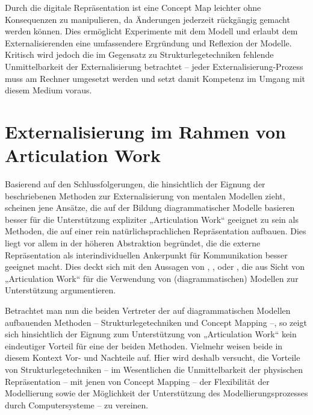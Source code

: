 Durch die digitale Repräsentation ist eine Concept Map leichter ohne Konsequenzen zu manipulieren, da Änderungen jederzeit rückgängig gemacht werden können. Dies ermöglicht Experimente mit dem Modell und erlaubt dem Externalisierenden eine umfassendere Ergründung und Reflexion der Modelle. Kritisch wird jedoch die im Gegensatz zu Strukturlegetechniken fehlende Unmittelbarkeit der Externalisierung betrachtet – jeder Externalisierung-Prozess muss am Rechner umgesetzt werden und setzt damit Kompetenz im Umgang mit diesem Medium voraus. \citet[][S. 30f]{Ifenthaler06}



\section{Externalisierung im Rahmen von Articulation Work} %
\label{sec:externalisierung_im_rahmen_von_articulation_work}

Basierend auf den Schlussfolgerungen, die \citet{Ifenthaler06} hinsichtlich der Eignung der beschriebenen Methoden zur Externalisierung von mentalen Modellen zieht, scheinen jene Ansätze, die auf der Bildung diagrammatischer Modelle basieren besser für die Unterstützung expliziter „Articulation Work“ geeignet zu sein als Methoden, die auf einer rein natürlichsprachlichen Repräsentation aufbauen. Dies liegt vor allem in der höheren Abstraktion begründet, die die externe Repräsentation als interindividuellen Ankerpunkt für Kommunikation besser geeignet macht. Dies deckt sich mit den Aussagen von  \citet{Sarini02}, \citet{Herrmann02}, \citet{Raposo04} oder \citet{Jorgensen04}, die aus Sicht von „Articulation Work“ für die Verwendung von (diagrammatischen) Modellen zur Unterstützung argumentieren.

Betrachtet man nun die beiden Vertreter der auf diagrammatischen Modellen aufbauenden Methoden -- Strukturlegetechniken und Concept Mapping --, so zeigt sich hinsichtlich der Eignung zum Unterstützung von „Articulation Work“ kein eindeutiger Vorteil für eine der beiden Methoden. Vielmehr weisen beide in diesem Kontext Vor- und Nachteile auf. Hier wird deshalb versucht, die Vorteile von Strukturlegetechniken -- im Wesentlichen die Unmittelbarkeit der physischen Repräsentation -- mit jenen von Concept Mapping -- der Flexibilität der Modellierung sowie der Möglichkeit der Unterstützung des Modellierungsprozesses durch Computersysteme -- zu vereinen.

